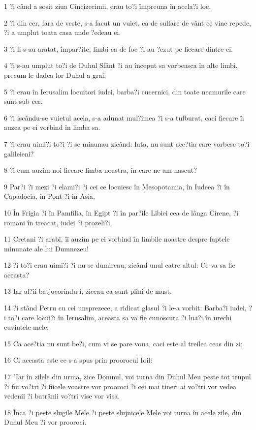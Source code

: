 \par 1 ?i când a sosit ziua Cincizecimii, erau to?i împreuna în acela?i loc.
\par 2 ?i din cer, fara de veste, s-a facut un vuiet, ca de suflare de vânt ce vine repede, ?i a umplut toata casa unde ?edeau ei.
\par 3 ?i li s-au aratat, împar?ite, limbi ca de foc ?i au ?ezut pe fiecare dintre ei.
\par 4 ?i s-au umplut to?i de Duhul Sfânt ?i au început sa vorbeasca în alte limbi, precum le dadea lor Duhul a grai.
\par 5 ?i erau în Ierusalim locuitori iudei, barba?i cucernici, din toate neamurile care sunt sub cer.
\par 6 ?i iscându-se vuietul acela, s-a adunat mul?imea ?i s-a tulburat, caci fiecare îi auzea pe ei vorbind în limba sa.
\par 7 ?i erau uimi?i to?i ?i se minunau zicând: Iata, nu sunt ace?tia care vorbesc to?i galileieni?
\par 8 ?i cum auzim noi fiecare limba noastra, în care ne-am nascut?
\par 9 Par?i ?i mezi ?i elami?i ?i cei ce locuiesc în Mesopotamia, în Iudeea ?i în Capadocia, în Pont ?i în Asia,
\par 10 În Frigia ?i în Pamfilia, în Egipt ?i în par?ile Libiei cea de lânga Cirene, ?i romani în treacat, iudei ?i prozeli?i,
\par 11 Cretani ?i arabi, îi auzim pe ei vorbind în limbile noastre despre faptele minunate ale lui Dumnezeu!
\par 12 ?i to?i erau uimi?i ?i nu se dumireau, zicând unul catre altul: Ce va sa fie aceasta?
\par 13 Iar al?ii batjocorindu-i, ziceau ca sunt plini de must.
\par 14 ?i stând Petru cu cei unsprezece, a ridicat glasul ?i le-a vorbit: Barba?i iudei, ?i to?i care locui?i în Ierusalim, aceasta sa va fie cunoscuta ?i lua?i în urechi cuvintele mele;
\par 15 Ca ace?tia nu sunt be?i, cum vi se pare voua, caci este al treilea ceas din zi;
\par 16 Ci aceasta este ce s-a spus prin proorocul Ioil:
\par 17 "Iar în zilele din urma, zice Domnul, voi turna din Duhul Meu peste tot trupul ?i fiii vo?tri ?i fiicele voastre vor prooroci ?i cei mai tineri ai vo?tri vor vedea vedenii ?i batrânii vo?tri vise vor visa.
\par 18 Înca ?i peste slugile Mele ?i peste slujnicele Mele voi turna în acele zile, din Duhul Meu ?i vor prooroci.
